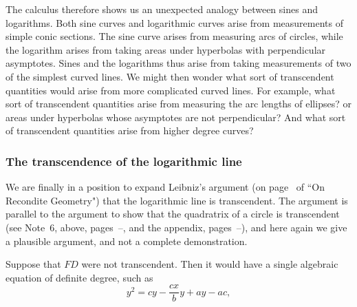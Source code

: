 \documentclass[twoside,openright]{article}
\begin{document}
The calculus therefore shows us an unexpected analogy between sines
and logarithms.  Both sine curves and logarithmic curves arise from
measurements of simple conic sections.  The sine curve arises from
measuring arcs of circles, while the logarithm arises from taking
areas under hyperbolas with perpendicular asymptotes.  Sines and the
logarithms thus arise from taking measurements of two of the simplest
curved lines.  We might then wonder what sort of transcendent
quantities would arise from more complicated curved lines.  For
example, what sort of transcendent quantities arise from measuring the
arc lengths of ellipses? or areas under hyperbolas whose asymptotes
are not perpendicular? And what sort of transcendent quantities arise
from higher degree curves?

\subsubsection*{The transcendence of the logarithmic line}

\label{blogtp}
We are finally in a position to expand Leibniz's argument (on page~\pageref{logtrans} of ``On Recondite Geometry") that the logarithmic line is transcendent.  The argument is parallel to the argument to show that the quadratrix of a circle is transcendent (see Note~6, above, pages~\pageref{begtc}--\pageref{endtc}, and the appendix, pages~\pageref{begapp}--\pageref{endapp}), and here again  we give a plausible argument, and not a complete demonstration.

Suppose that $FD$ were not transcendent.  Then it would have a single algebraic equation of definite degree, such as 
$$y^2 = cy - \frac{cx}{b}y + ay - ac,$$
\end{document}
